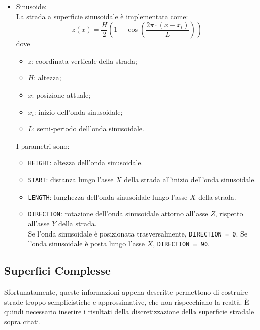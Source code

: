 \begin{itemize}
\begin{pseudoc}
	{ X_road	Z_left	Z_right }
	(XZ_DATA)
	-1.0e04	0	0
	0.0500	0	0
	0.1000	0	0
	0.1500	0	0
	... ... ...
	\end{pseudoc}
	\item Sinusoide:\\
	La strada a superficie sinusoidale è implementata come:
	\begin{equation}
	z(x)=\frac{H}{2}\left( 1 - \cos \left( \frac{2\pi \cdot (x-x_i)}{L} \right)   \right) 
	\end{equation}
	dove	
	\begin{itemize}
	 	\item $z$: coordinata verticale della strada;
	 	\item $H$: altezza;
	 	\item $x$: posizione attuale;
	 	\item $x_i$: inizio dell'onda sinusoidale;
	 	\item $L$: semi-periodo dell'onda sinusoidale.
	\end{itemize}
	I parametri sono:	
	\begin{itemize}
		\item \texttt{HEIGHT}: altezza dell'onda sinusoidale.
		\item \texttt{START}: distanza lungo l'asse $X$ della strada all'inizio dell'onda sinusoidale.
		\item \texttt{LENGTH}: lunghezza dell'onda sinusoidale lungo l'asse $X$ della strada.
		\item \texttt{DIRECTION}: rotazione dell'onda sinusoidale attorno all'asse $Z$, rispetto all'asse $Y$ della strada.\\
		Se l'onda sinusoidale è posizionata trasversalmente, \texttt{DIRECTION = 0}. Se l'onda sinusoidale è posta lungo l'asse $X$, \texttt{DIRECTION = 90}.
	\end{itemize}
\end{itemize}
%
%
\subsection{Superfici Complesse}
Sfortunatamente, queste informazioni appena descritte permettono di costruire strade troppo semplicistiche e approssimative, che non rispecchiano la realtà. È quindi necessario inserire i risultati della discretizzazione della superficie stradale sopra citati.

